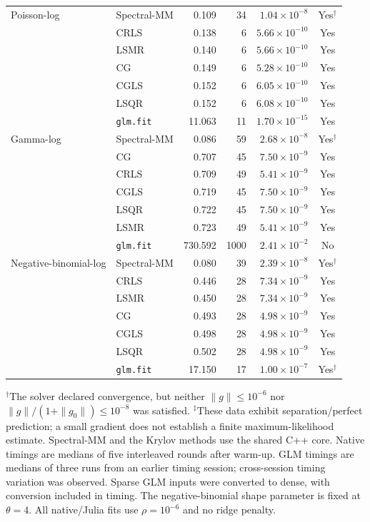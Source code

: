 \begin{table}[htbp]
\begin{tabular}{llrrrc}
Poisson-log
& Spectral-MM & 0.109 & 34 & $1.04\times10^{-8}$ & Yes$^{\dagger}$ \\
& CRLS & 0.138 & 6 & $5.66\times10^{-10}$ & Yes \\
& LSMR & 0.140 & 6 & $5.66\times10^{-10}$ & Yes \\
& CG & 0.149 & 6 & $5.28\times10^{-10}$ & Yes \\
& CGLS & 0.152 & 6 & $6.05\times10^{-10}$ & Yes \\
& LSQR & 0.152 & 6 & $6.08\times10^{-10}$ & Yes \\
& \texttt{glm.fit} & 11.063 & 11 & $1.70\times10^{-15}$ & Yes \\
\midrule

Gamma-log
& Spectral-MM & 0.086 & 59 & $2.68\times10^{-8}$ & Yes$^{\dagger}$ \\
& CG & 0.707 & 45 & $7.50\times10^{-9}$ & Yes \\
& CRLS & 0.709 & 49 & $5.41\times10^{-9}$ & Yes \\
& CGLS & 0.719 & 45 & $7.50\times10^{-9}$ & Yes \\
& LSQR & 0.722 & 45 & $7.50\times10^{-9}$ & Yes \\
& LSMR & 0.723 & 49 & $5.41\times10^{-9}$ & Yes \\
& \texttt{glm.fit} & 730.592 & 1000 & $2.41\times10^{-2}$ & No \\
\midrule

Negative-binomial-log
& Spectral-MM & 0.080 & 39 & $2.39\times10^{-8}$ & Yes$^{\dagger}$ \\
& CRLS & 0.446 & 28 & $7.34\times10^{-9}$ & Yes \\
& LSMR & 0.450 & 28 & $7.34\times10^{-9}$ & Yes \\
& CG & 0.493 & 28 & $4.98\times10^{-9}$ & Yes \\
& CGLS & 0.498 & 28 & $4.98\times10^{-9}$ & Yes \\
& LSQR & 0.502 & 28 & $4.98\times10^{-9}$ & Yes \\
& \texttt{glm.fit} & 17.150 & 17 & $1.00\times10^{-7}$ & Yes$^{\dagger}$ \\

\bottomrule
\end{tabular}
\par\smallskip
\begin{minipage}{\linewidth}
\footnotesize
$^{\dagger}$The solver declared convergence, but neither $\|g\|\leq 10^{-6}$ nor
$\|g\|/(1+\|g_0\|)\leq 10^{-8}$ was satisfied.
$^{\ddagger}$These data exhibit separation/perfect prediction; a small gradient does not establish a finite maximum-likelihood estimate.
Spectral-MM and the Krylov methods use the shared C++ core.
Native timings are medians of five interleaved rounds after warm-up.
GLM timings are medians of three runs from an earlier timing session;
cross-session timing variation was observed. Sparse GLM inputs were converted to dense, with conversion included in timing.
The negative-binomial shape parameter is fixed at $\theta=4$.
All native/Julia fits use $\rho=10^{-6}$ and no ridge penalty.
\end{minipage}
\end{table}

